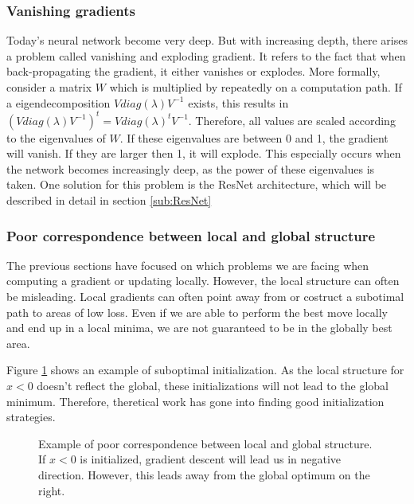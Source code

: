 \subsubsection{Vanishing gradients}\label{sub:Vanishing_gradient} Today's neural
network become very deep. But with increasing depth, there arises a problem
called vanishing and exploding gradient. It refers to the fact that when
back-propagating the gradient, it either vanishes or explodes. More formally,
consider a matrix $W$ which is multiplied by repeatedly on a computation path.
If a eigendecomposition $Vdiag(\lambda )V^{-1}$ exists, this results in
$(Vdiag(\lambda )V^{-1})^t=Vdiag(\lambda )^tV^{-1}$. Therefore, all values are
scaled according to the eigenvalues of $W$. If these eigenvalues are between 0
and 1, the gradient will vanish. If they are larger then 1, it will explode.
This especially occurs when the network becomes increasingly deep, as the power
of these eigenvalues is taken. One solution for this problem is the ResNet
architecture, which will be described in detail in section \ref{sub:ResNet}

\subsubsection{Poor correspondence between local and global
structure}\label{prob:5}

The previous sections have focused on which problems we are facing when
computing a gradient or updating locally. However, the local structure can often
be misleading. Local gradients can often point away from  or costruct a
subotimal path to areas of low loss. Even if we are able to perform the best
move locally and end up in a local minima, we are not guaranteed to be in the
globally best area. 

Figure \ref{fig:Poor_correspondence}
shows an example of suboptimal initialization. As the local structure for $x<0$
doesn't reflect the global, these initializations will not lead to the global
minimum. Therefore, theretical work has gone into finding good initialization
strategies.

\begin{figure}[h]\label{fig:Poor_correspondence}
    \begin{center}
        \caption{Example of poor correspondence between local and global
        structure. If $x<0$ is initialized, gradient descent will lead us in
        negative direction. However, this leads away from the global optimum
        on the right.}
    \end{center}
\end{figure}

